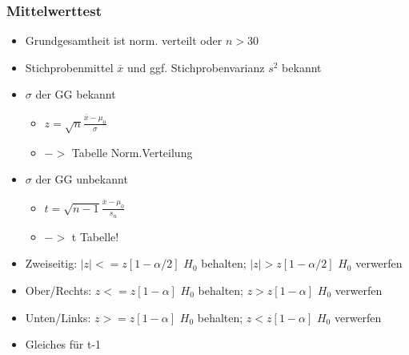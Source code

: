 \documentclass[a4paper]{article}
\begin{document}
\begin{landscape}
\begin{multicols}{4}
        \subsubsection*{Mittelwerttest}
        \begin{itemize}[noitemsep,nolistsep,leftmargin=*]
            \item Grundgesamtheit ist norm. verteilt oder $n > 30$
            \item Stichprobenmittel $\overline{x}$ und ggf. Stichprobenvarianz $s^2$ bekannt
            \item $\sigma$ der GG bekannt
            \begin{itemize}[noitemsep,nolistsep,leftmargin=*]
                \item $z = \sqrt{n}\frac{\overline{x}-\mu_0}{\sigma}$
                \item $->$ Tabelle Norm.Verteilung
            \end{itemize}
            \item $\sigma$ der GG unbekannt
            \begin{itemize}[noitemsep,nolistsep,leftmargin=*]
                \item $t = \sqrt{n-1}\frac{\overline{x}-\mu_0}{s_n}$
                \item $->$ t Tabelle!
            \end{itemize}
            \item Zweiseitig: $|z| <= z[1-\alpha/2]$ $H_0$ behalten; $|z| > z[1-\alpha/2]$ $H_0$ verwerfen
            \item Ober/Rechts: $z <= z[1-\alpha]$ $H_0$ behalten; $z > z[1-\alpha]$ $H_0$ verwerfen
            \item Unten/Links: $z >= z[1-\alpha]$ $H_0$ behalten; $z < z[1-\alpha]$ $H_0$ verwerfen
            \item Gleiches für t-1
        \end{itemize}

\end{multicols}
\end{landscape}
\end{document}
